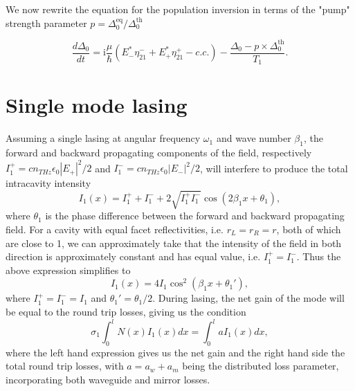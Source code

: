 \documentclass[preprint,secnumarabic,amssymb, nobibnotes, aip, prd]{revtex4-1}
\begin{document}
We now rewrite the equation for the population inversion in terms of the "pump" strength parameter $p=\Delta_0^{\text{eq}}/\Delta_0^{\text{th}}$

\begin{equation}
\label{eq:inversion-p}
\frac{d\Delta_{0}}{dt} = \mathrm{i}\frac{\mu}{\hslash}\left(  E_{-}^{\ast}\eta_{21}^{-}+E_{+}^{\ast}\eta_{21}^{+}-c.c.\right) -\frac{\Delta_{0}-p\times\Delta_{0}^{\text{th}}}{T_1}.
\end{equation}

\section{Single mode lasing}

 Assuming a single lasing at angular frequency $\omega_1$ and wave number $\beta_1$, the forward and backward propagating components of the field, respectively $I_1^+ = cn_{THz}\epsilon_0 |E_+|^2/2$ and $I_1^-= cn_{THz}\epsilon_0 |E_-|^2/2$, will interfere to produce the total intracavity intensity    
\begin{equation}
I_1(x) = I_1^+ + I_1^-+2\sqrt{I_1^+I_1^-}\cos(2\beta_1 x+\theta_1), 
\end{equation} 
where $\theta_1$ is the phase difference between the forward and backward propagating field. For a cavity with equal facet reflectivities, i.e. $r_L = r_R = r$, both of which are close to 1, we can approximately take that the intensity of the field in both direction is approximately constant and has equal value, i.e. $I_1^+=I_1^-$. Thus the above expression simplifies to
\begin{equation}
\label{eq:interference}
I_1(x) =4I_1\cos^2(\beta_1 x+\theta_1'),
\end{equation} 
where $I_1^+=I_1^-=I_1$ and $\theta_1'= \theta_1/2$.
During lasing, the net gain of the mode will be equal to the round trip losses, giving us the condition 
\begin{equation}
\label{eq:balance}
\sigma_1\int_{0}^{l} N(x)I_1(x)dx = \int_{0}^{l} a I_1(x)dx,
\end{equation} 
where the left hand expression gives us the net gain and the right hand side the total round trip losses, with $a = a_w+a_m$ being the distributed loss parameter, incorporating both waveguide and mirror losses. 
\end{document}
